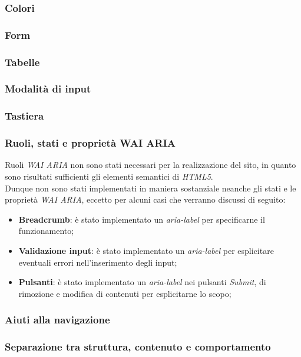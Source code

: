 \subsubsection{Colori}
\label{subsubsec:accessibility-colors}

\subsubsection{Form}
\label{subsubsec:accessibility-forms}

\subsubsection{Tabelle}
\label{subsubsec:accessibility-tables}

\subsubsection{Modalità di input}
\label{subsubsec:accessibility-input}

\subsubsection{Tastiera}
\label{subsubsec:accessibility-keyboard}

\subsubsection{Ruoli, stati e proprietà WAI ARIA}
\label{subsubsec:accessibility-aria}

Ruoli \textit{WAI ARIA} non sono stati necessari per la realizzazione del sito, in quanto sono risultati sufficienti gli elementi semantici di \textit{HTML5}. \\
Dunque non sono stati implementati in maniera sostanziale neanche gli stati e le proprietà \textit{WAI ARIA}, eccetto per alcuni casi che verranno discussi di seguito:
\begin{itemize}
    \item \textbf{Breadcrumb}: è stato implementato un \textit{aria-label} per specificarne il funzionamento;
    \item \textbf{Validazione input}: è stato implementato un \textit{aria-label} per esplicitare eventuali errori nell'inserimento degli input;
    \item \textbf{Pulsanti}: è stato implementato un \textit{aria-label} nei pulsanti \textit{Submit}, di rimozione e modifica di contenuti per esplicitarne lo scopo;
\end{itemize}

\subsubsection{Aiuti alla navigazione}
\label{subsubsec:accessibility-navigation}

\subsubsection{Separazione tra struttura, contenuto e comportamento}
\label{subsubsec:accessibility-separation}